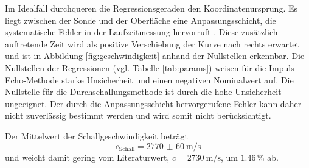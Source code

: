 Im Idealfall durchqueren die Regressionsgeraden den Koordinatenursprung.
Es liegt zwischen der Sonde und der Oberfläche eine Anpassungsschicht, die systematische Fehler in der Laufzeitmessung hervorruft \cite{skript}.
Diese zusätzlich auftretende Zeit wird als positive Verschiebung der Kurve nach rechts erwartet und ist in Abbildung \ref{fig:geschwindigkeit} anhand der Nullstellen erkennbar.
Die Nullstellen der Regressionen (vgl. Tabelle \ref{tab:params}) weisen für die Impuls-Echo-Methode starke Unsicherheit und einen negativen Nominalwert auf.
Die Nullstelle für die Durchschallungsmethode ist durch die hohe Unsicherheit ungeeignet.
Der durch die Anpassungsschicht hervorgerufene Fehler kann daher nicht zuverlässig bestimmt werden und wird somit nicht berücksichtigt.

Der Mittelwert der Schallgeschwindigkeit beträgt
\begin{equation}
	c_\text{Schall}=\SI{2770(60)}{\meter\per\second}
	\label{qu:geschwindigkeit}
\end{equation}
und weicht damit gering vom Literaturwert, $c=\SI{2730}{\meter\per\second}$, um $1.46\,\%$ ab.


